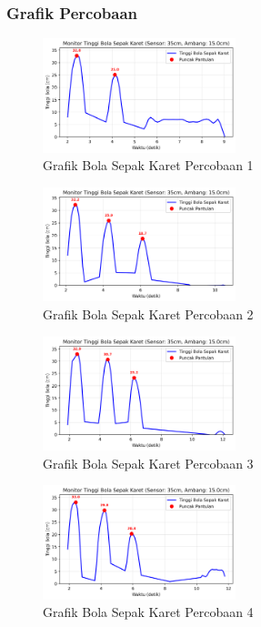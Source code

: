 \subsubsection{Grafik Percobaan}
\begin{figure}[htbp]
    \centering
    \includegraphics[width=0.5\textwidth]{chapters/DataPercobaan/Grafik_Bola_Sepak_Karet_1.png}
    \caption{Grafik Bola Sepak Karet Percobaan 1}
\end{figure}
\begin{figure}[htbp]
    \centering
    \includegraphics[width=0.5\textwidth]{chapters/DataPercobaan/Grafik_Bola_Sepak_Karet_2.png}
    \caption{Grafik Bola Sepak Karet Percobaan 2}
\end{figure}
\begin{figure}[htbp]
    \centering
    \includegraphics[width=0.5\textwidth]{chapters/DataPercobaan/Grafik_Bola_Sepak_Karet_3.png}
    \caption{Grafik Bola Sepak Karet Percobaan 3}
\end{figure}
\begin{figure}[htbp]
    \centering
    \includegraphics[width=0.5\textwidth]{chapters/DataPercobaan/Grafik_Bola_Sepak_Karet_4.png}
    \caption{Grafik Bola Sepak Karet Percobaan 4}
\end{figure}
